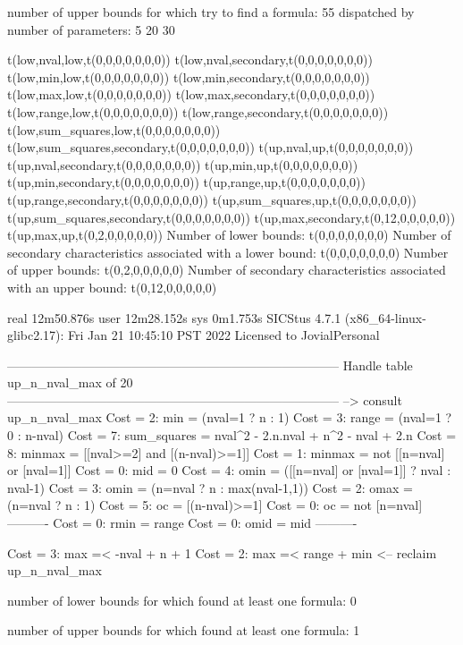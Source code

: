 number of upper bounds for which try to find a formula: 55
dispatched by number of parameters: 5  20  30

t(low,nval,low,t(0,0,0,0,0,0,0))
t(low,nval,secondary,t(0,0,0,0,0,0,0))
t(low,min,low,t(0,0,0,0,0,0,0))
t(low,min,secondary,t(0,0,0,0,0,0,0))
t(low,max,low,t(0,0,0,0,0,0,0))
t(low,max,secondary,t(0,0,0,0,0,0,0))
t(low,range,low,t(0,0,0,0,0,0,0))
t(low,range,secondary,t(0,0,0,0,0,0,0))
t(low,sum_squares,low,t(0,0,0,0,0,0,0))
t(low,sum_squares,secondary,t(0,0,0,0,0,0,0))
t(up,nval,up,t(0,0,0,0,0,0,0))
t(up,nval,secondary,t(0,0,0,0,0,0,0))
t(up,min,up,t(0,0,0,0,0,0,0))
t(up,min,secondary,t(0,0,0,0,0,0,0))
t(up,range,up,t(0,0,0,0,0,0,0))
t(up,range,secondary,t(0,0,0,0,0,0,0))
t(up,sum_squares,up,t(0,0,0,0,0,0,0))
t(up,sum_squares,secondary,t(0,0,0,0,0,0,0))
t(up,max,secondary,t(0,12,0,0,0,0,0))
t(up,max,up,t(0,2,0,0,0,0,0))
Number of lower bounds:                                             t(0,0,0,0,0,0,0)
Number of secondary characteristics associated with a lower bound:  t(0,0,0,0,0,0,0)
Number of upper bounds:                                             t(0,2,0,0,0,0,0)
Number of secondary characteristics associated with an upper bound: t(0,12,0,0,0,0,0)

real	12m50.876s
user	12m28.152s
sys	0m1.753s
SICStus 4.7.1 (x86_64-linux-glibc2.17): Fri Jan 21 10:45:10 PST 2022
Licensed to JovialPersonal


--------------------------------------------------------------------------------
Handle table up_n_nval_max of 20
--------------------------------------------------------------------------------
--> consult up_n_nval_max
Cost =  2:  min         = (nval=1 ? n : 1)
Cost =  3:  range       = (nval=1 ? 0 : n-nval)
Cost =  7:  sum_squares = nval^2 - 2.n.nval + n^2 - nval + 2.n
Cost =  8:  minmax      = [[nval>=2] and [(n-nval)>=1]]
Cost =  1:  minmax      = not [[n=nval] or [nval=1]]
Cost =  0:  mid         = 0
Cost =  4:  omin        = ([[n=nval] or [nval=1]] ? nval : nval-1)
Cost =  3:  omin        = (n=nval ? n : max(nval-1,1))
Cost =  2:  omax        = (n=nval ? n : 1)
Cost =  5:  oc          = [(n-nval)>=1]
Cost =  0:  oc          = not [n=nval]
----------
Cost =  0:  rmin        = range
Cost =  0:  omid        = mid
----------

Cost =  3:  max =< -nval + n + 1
Cost =  2:  max =< range + min
<-- reclaim up_n_nval_max

number of lower bounds for which found at least one formula: 0

number of upper bounds for which found at least one formula: 1


